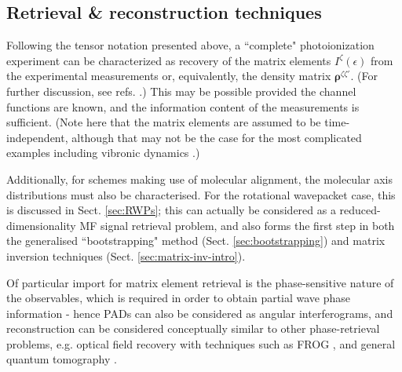 \subsection{Retrieval \& reconstruction techniques\label{sec:recon-techniques-intro}}


Following the tensor notation presented above, a ``complete" photoionization experiment can be characterized as recovery of the matrix elements $I^{\zeta}(\epsilon)$ from the experimental measurements or, equivalently, the density matrix $\mathbf{\rho}^{\zeta\zeta'}$. (For further discussion, see refs. \cite{Reid2003,kleinpoppen2013perfect,hockett2018QMP1}.) This may be possible provided the channel functions are known, and the information content of the measurements is sufficient. (Note here that the matrix elements are assumed to be time-independent, although that may not be the case for the most complicated examples including vibronic dynamics \cite{hockett2018QMP2}.) 

Additionally, for schemes making use of molecular alignment, the molecular axis distributions must also be characterised. For the rotational wavepacket case, this is discussed in Sect. \ref{sec:RWPs}; this can actually be considered as a reduced-dimensionality MF signal retrieval problem, and also forms the first step in both the generalised ``bootstrapping" method (Sect. \ref{sec:bootstrapping}) and matrix inversion techniques (Sect. \ref{sec:matrix-inv-intro}).

Of particular import for matrix element retrieval is the phase-sensitive nature of the observables, which is required in order to obtain partial wave phase information - hence PADs can also be considered as angular interferograms, and reconstruction can be considered conceptually similar to other phase-retrieval problems, e.g. optical field recovery with techniques such as FROG \cite{trebino2000FrequencyResolvedOpticalGating}, and general quantum tomography \cite{MauroDAriano2003}. 



